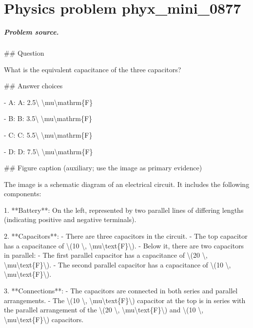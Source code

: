 
\chapter{Physics problem phyx\_mini\_0877}
\label{ch:PhyXMiniProblems_problem_phyx_mini_0877}

\paragraph{Problem source.}
\#\# Question

What is the equivalent capacitance of the three capacitors?

\#\# Answer choices

- A: A: 2.5\textbackslash{} \textbackslash{}mu\textbackslash{}mathrm\{F\}

- B: B: 3.5\textbackslash{} \textbackslash{}mu\textbackslash{}mathrm\{F\}

- C: C: 5.5\textbackslash{} \textbackslash{}mu\textbackslash{}mathrm\{F\}

- D: D: 7.5\textbackslash{} \textbackslash{}mu\textbackslash{}mathrm\{F\}

\#\# Figure caption (auxiliary; use the image as primary evidence)

The image is a schematic diagram of an electrical circuit. It includes the following components:

1. **Battery**: On the left, represented by two parallel lines of differing lengths (indicating positive and negative terminals).

2. **Capacitors**: 
   - There are three capacitors in the circuit.
   - The top capacitor has a capacitance of \textbackslash{}(10 \textbackslash{}, \textbackslash{}mu\textbackslash{}text\{F\}\textbackslash{}).
   - Below it, there are two capacitors in parallel:
     - The first parallel capacitor has a capacitance of \textbackslash{}(20 \textbackslash{}, \textbackslash{}mu\textbackslash{}text\{F\}\textbackslash{}).
     - The second parallel capacitor has a capacitance of \textbackslash{}(10 \textbackslash{}, \textbackslash{}mu\textbackslash{}text\{F\}\textbackslash{}).

3. **Connections**: 
   - The capacitors are connected in both series and parallel arrangements.
   - The \textbackslash{}(10 \textbackslash{}, \textbackslash{}mu\textbackslash{}text\{F\}\textbackslash{}) capacitor at the top is in series with the parallel arrangement of the \textbackslash{}(20 \textbackslash{}, \textbackslash{}mu\textbackslash{}text\{F\}\textbackslash{}) and \textbackslash{}(10 \textbackslash{}, \textbackslash{}mu\textbackslash{}text\{F\}\textbackslash{}) capacitors.

